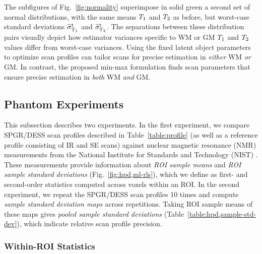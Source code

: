 The subfigures of Fig.~\ref{fig:normality} superimpose 
in solid green a second set of normal distributions, 
with the same means $T_1$ and $T_2$ as before, 
but worst-case standard deviations $\widetilde{\sigma}_{\mathrm{T}_1}^\mathrm{t}$ and $\widetilde{\sigma}_{\mathrm{T}_2}^\mathrm{t}$. 
The separations between these distribution pairs 
visually depict how estimator variances specific 
to WM or GM $T_1$ and $T_2$ values differ 
from worst-case variances. 
Using the fixed latent object parameters 
to optimize scan profiles can tailor scans 
for precise estimation in \emph{either} WM \emph{or} GM. 
In contrast, the proposed min-max formulation finds scan parameters 
that ensure precise estimation 
in \emph{both} WM \emph{and} GM.	

\subsection{Phantom Experiments}
\label{ss,scn-dsgn,exp,phant}

This subsection describes two experiments. 
In the first experiment, 
we compare SPGR/DESS scan profiles 
described in Table~\ref{table:profile} 
(as well as a reference profile consisting of IR and SE scans) 
against nuclear magnetic resonance (NMR) measurements 
from the National Institute for Standards and Technology (NIST) 
\cite{keenan:16:msm}.
These measurements provide information 
about \emph{ROI sample means} and \emph{ROI sample standard deviations} 
(Fig.~\ref{fig:hpd,ml-rls}), 
which we define as first- and second-order statistics 
computed across voxels within an ROI.
In the second experiment, 
we repeat the SPGR/DESS scan profiles 10 times 
and compute \emph{sample standard deviation maps} 
across repetitions. 
Taking ROI sample means of these maps 
gives \emph{pooled sample standard deviations} 
(Table~\ref{table:hpd,sample-std-dev}), 
which indicate relative scan profile precision.

\subsubsection{Within-ROI Statistics} 
\label{sss,scn-dsgn,exp,phant,roi}

